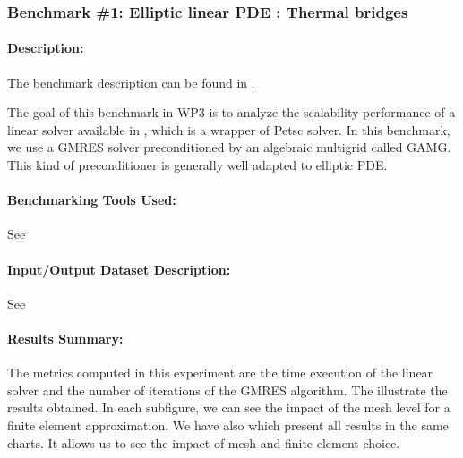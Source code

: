 \subsubsection{Benchmark \#1: Elliptic linear PDE : Thermal bridges}
\label{sec:WP3:Feelpp:benchmark:thermal_bridges}
\paragraph{Description:} %
The benchmark description can be found in
.

The goal of this benchmark in WP3 is to analyze the scalability performance of a linear solver
available in \Feelpp, which is a wrapper of Petsc solver.
In this benchmark, we use a GMRES solver preconditioned by an algebraic
multigrid called GAMG. This kind of preconditioner is generally well adapted to
elliptic PDE.


\paragraph{Benchmarking Tools Used:} %
See 

\paragraph{Input/Output Dataset Description:}
See 

\paragraph{Results Summary:}%

The metrics computed in this experiment are the time execution of the linear solver and the number of iterations of the GMRES algorithm.
The 
illustrate the results obtained. In each subfigure, we can see the impact of the
mesh level for a finite element approximation. We have also 
which present all results in the same charts. It allows us to see the impact of
mesh and finite element choice.


